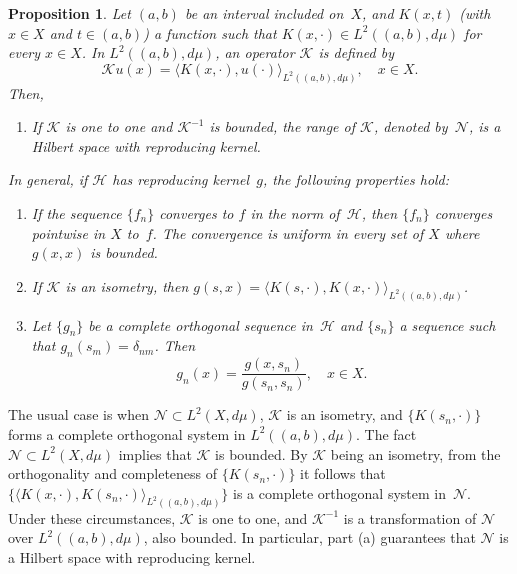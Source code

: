 \documentclass[11pt]{amsart}
\theoremstyle{plain}
\newtheorem{Prop}{Proposition}
\begin{document}
\begin{Prop}
\label{prop:dabu}
Let $(a,b)$ be an interval included on~$X$,
and $K(x,t)$ (with $x \in X$ and $t \in (a,b)$) a function such that
$K(x,\cdot) \in L^{2}((a,b),d\mu)$ for every $x \in X$.
In $L^{2}((a,b),d\mu)$, an operator $\mathcal{K}$ is defined by
\begin{equation*}
\label{nucleo}
  \mathcal{K}u(x) = \langle K(x,\cdot), u(\cdot)\rangle_{L^{2}((a,b),d\mu)},
  \quad x \in X.
\end{equation*}
Then,
\begin{enumerate}
\item[(a)] If $\mathcal{K}$ is one to one and $\mathcal{K}^{-1}$ is bounded,
the range of $\mathcal{K}$,
denoted by~$\mathcal{N}$, is a Hilbert space with reproducing kernel.
\end{enumerate}
In general, if $\mathcal{H}$ has reproducing kernel~$g$,
the following properties hold:
\begin{enumerate}
\item[(b)] If the sequence $\{f_{n}\}$ converges to $f$ in the norm of~$\mathcal{H}$,
then $\{f_{n}\}$ converges pointwise in $X$ to~$f$. The convergence is uniform in every set of $X$ where $g(x,x)$ is bounded.

\item[(c)] If $\mathcal{K}$ is an isometry, then
$g(s,x) = \langle K(s,\cdot), K(x,\cdot)\rangle_{L^{2}((a,b),d\mu)}$.

\item[(d)] Let $\{g_{n}\}$ be a complete orthogonal sequence in~$\mathcal{H}$
and $\{s_{n}\}$ a sequence such that $g_{n}(s_{m}) = \delta_{nm}$. Then
\begin{equation*}
  g_{n}(x)  = \frac{g(x,s_{n})}{g(s_{n},s_{n})}, \quad x \in X.
\end{equation*}
\end{enumerate}
\end{Prop}

The usual case is when $\mathcal{N} \subset L^{2}(X,d\mu)$, $\mathcal{K}$ is an isometry,
and $\{K(s_n,\cdot)\}$ forms a complete orthogonal system in $L^2((a,b),d\mu)$.
The fact $\mathcal{N} \subset L^{2}(X,d\mu)$ implies that $\mathcal{K}$ is bounded.
By $\mathcal{K}$ being an isometry, from the orthogonality and completeness
of $\{K(s_n,\cdot)\}$ it follows that
$\{\langle K(x,\cdot), K(s_n,\cdot)\rangle_{L^{2}((a,b),d\mu)}\}$
is a complete orthogonal system in~$\mathcal{N}$.
Under these circumstances, $\mathcal{K}$ is one to one, and $\mathcal{K}^{-1}$ is a transformation of $\mathcal{N}$ over $L^{2}((a,b),d\mu)$, also bounded.
In particular, part (a) guarantees that
$\mathcal{N}$ is a Hilbert space with reproducing kernel.
\end{document}
